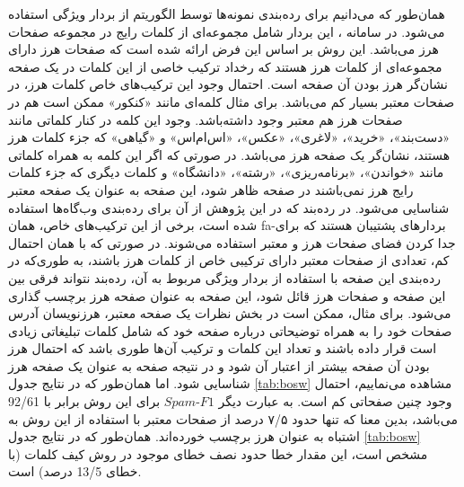 \documentclass[twoside, a4paper,11pt]{book}
\numberwithin{equation}{chapter}
\numberwithin{table}{chapter}
\numberwithin{figure}{chapter}
\numberwithin{equation}{chapter}
\newcommand{\mls}[1]{\gls{fa-#1}\glsuseri{la-#1}}
\begin{document}
همان‌طور که می‌دانیم برای رده‌بندی نمونه‌ها توسط الگوریتم  از بردار ویژگی‌ استفاده می‌شود. در سامانه ، این بردار شامل مجموعه‌ای از کلمات رایج در مجموعه صفحات هرز می‌باشد. این روش بر اساس این فرض ارائه شده است که صفحات هرز دارای مجموعه‌ای از کلمات هرز هستند که رخداد ترکیب خاصی از این کلمات در یک صفحه نشان‌گر هرز بودن آن صفحه است. احتمال وجود این ترکیب‌های خاص کلمات هرز، در صفحات معتبر بسیار کم می‌باشد. برای مثال کلمه‌ای مانند «کنکور» ممکن است هم در صفحات هرز هم معتبر وجود داشته‌باشد. وجود این کلمه در کنار کلماتی مانند «دست‌بند»، «خرید»، «لاغری»، «عکس»، «اس‌ام‌اس» و «گیاهی» که جزء کلمات هرز هستند، نشان‌گر یک صفحه هرز می‌باشد. در صورتی که اگر این کلمه به همراه کلماتی مانند «خواندن»، «برنامه‌ریزی»، «رشته»، «دانشگاه» و کلمات دیگری که جزء کلمات رایج هرز نمی‌باشند در صفحه ظاهر شود، این صفحه به عنوان یک صفحه معتبر شناسایی می‌شود. در رده‌بند  که در این پژوهش از آن برای رده‌بندی وب‌گاه‌ها استفاده شده است، برخی از این ترکیب‌های خاص، همان \mls{بردارهای پشتیبان} هستند که برای جدا کردن فضای صفحات هرز و معتبر استفاده می‌شوند. در صورتی که با همان احتمال کم، تعدادی از صفحات معتبر دارای ترکیبی خاص از کلمات هرز باشند، به طوری‌که در رده‌بندی این صفحه با استفاده از بردار ویژگی مربوط به آن، رده‌بند نتواند فرقی بین این صفحه و صفحات هرز قائل شود، این صفحه به عنوان صفحه هرز برچسب گذاری می‌شود. برای مثال، ممکن است در بخش نظرات یک صفحه معتبر، هرزنویسان آدرس صفحات خود را به همراه توضیحاتی درباره صفحه خود که شامل کلمات تبلیغاتی زیادی است قرار داده باشند و تعداد این کلمات و ترکیب آن‌ها طوری باشد که احتمال هرز بودن آن صفحه بیشتر از اعتبار آن شود و در نتیجه صفحه به عنوان یک صفحه هرز شناسایی شود. اما همان‌طور که در نتایج جدول \ref{tab:bosw} مشاهده می‌نماییم، احتمال وجود چنین صفحاتی کم است. به عبارت دیگر $Spam\text{-}F1$ برای این روش برابر با 92/61 می‌باشد، بدین معنا که تنها حدود ۷/۵ درصد از صفحات معتبر با استفاده از این روش به اشتباه به عنوان هرز برچسب خورده‌اند. همان‌طور که در نتایج جدول \ref{tab:bosw} مشخص است، این مقدار خطا حدود نصف خطای موجود در روش کیف کلمات (با خطای 13/5 درصد) است.
\end{document}
